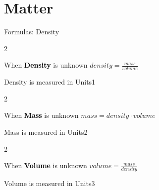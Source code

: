 \documentclass[../../main.tex]{subfiles}
\begin{document}
\chapter{Matter}

\newcommand{\showFormula}[3]{
	\begin{multicols}{2}
    \begin{boxRed}{When \textcolor{black}{\textbf{#1}} is unknown}
        #2
    \end{boxRed}
	\begin{boxBlue}{#1 is measured in}
        #3
	\end{boxBlue}
\end{multicols}
}

\begin{boxBox}{Formulas: Density}
    \showFormula{Density}{$density = \frac{mass}{volume}$}{Units1}
    \showFormula{Mass}{$mass = density \cdot volume$}{Units2}
    \showFormula{Volume}{$volume = \frac{mass}{density}$}{Units3}
\end{boxBox}
\end{document}
